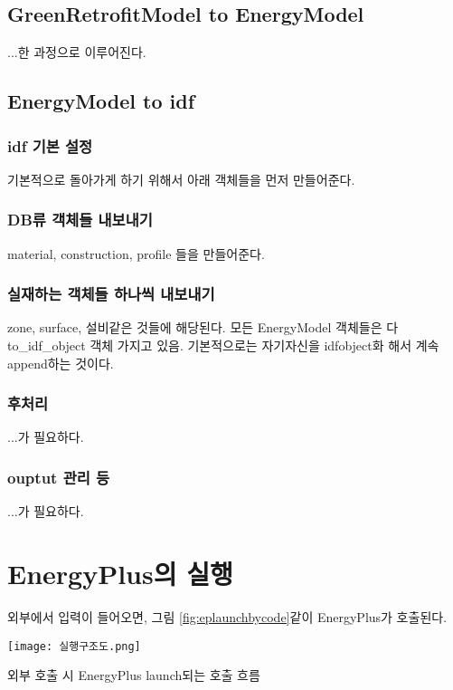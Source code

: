 \subsection{GreenRetrofitModel to EnergyModel}
...한 과정으로 이루어진다.

\subsection{EnergyModel to idf}

\subsubsection{idf 기본 설정}
기본적으로 돌아가게 하기 위해서 아래 객체들을 먼저 만들어준다.

\subsubsection{DB류 객체들 내보내기}
material, construction, profile 들을 만들어준다.

\subsubsection{실재하는 객체들 하나씩 내보내기}
zone, surface, 설비같은 것들에 해당된다. 모든 EnergyModel 객체들은 다 to\_idf\_object 객체 가지고 있음. 기본적으로는 자기자신을 idfobject화 해서 계속 append하는 것이다.

\subsubsection{후처리}
...가 필요하다.

\subsubsection{ouptut 관리 등}
...가 필요하다.


\section{EnergyPlus의 실행}
외부에서 입력이 들어오면, 그림 \ref{fig:eplaunchbycode}\와 같이 EnergyPlus가 호출된다.
\begin{defaultfigure}
  \texttt{[image: 실행구조도.png]}
  \caption{외부 호출 시 EnergyPlus launch되는 호출 흐름}
  \label{fig:eplaunchbycode}
\end{defaultfigure}

